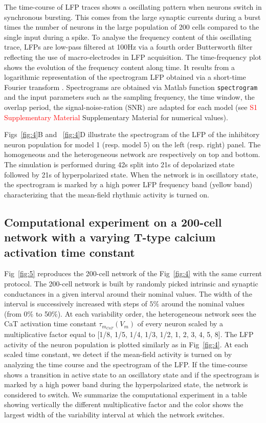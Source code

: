 The time-course of LFP traces shows a oscillating pattern when neurons switch in synchronous bursting.  This comes from the large synaptic currents during a burst times the number of neurons in the large population of 200 cells compared to the single input during a spike.  To analyse the frequency content of this oscillating trace,  LFPs are low-pass filtered at 100Hz via a fourth order Butterworth filter reflecting the use of macro-electrodes in LFP acquisition. The time-frequency plot shows the evolution of the frequency content along time. It results from a logarithmic representation of the spectrogram LFP obtained via a short-time Fourier transform \citep{drion_switchable_2018}. Spectrograms are obtained via Matlab function \texttt{spectrogram} and the input parameters such as the sampling frequency, the time window, the overlap period, the signal-noise-ration (SNR) are adapted for each model (see \textcolor{red}{S1 Supplementary Material} Supplementary Material for numerical values).

Figs~\ref{fig:4}B and ~\ref{fig:4}D illustrate the spectrogram of the LFP of the inhibitory neuron population for model 1 (resp. model 5) on the left (resp. right) panel. The homogeneous and the heterogeneous network are respectively on top and bottom. The simulation is performed during 42s split into 21s of depolarized state followed by 21s of hyperpolarized state. When the network is in oscillatory state, the spectrogram is marked by a high power LFP frequency band (yellow band) characterizing that the mean-field rhythmic activity is turned on. 


\subsection{Computational experiment  on a 200-cell network with a varying T-type calcium activation time constant }
Fig~\ref{fig:5} reproduces the 200-cell network of the Fig~\ref{fig:4} with the same current protocol. The 200-cell network is built by randomly picked intrinsic and synaptic conductances in a given interval around their nominal values. The width of the interval is successively  increased with steps of $5\%$ around the nominal values (from 0$\%$ to 50$\%$).  At each variability order, the heterogeneous network sees the CaT activation time constant $\tau_{m_{CaT}}(V_m)$ of every neuron scaled by a multiplicative factor equal to [1/8, 1/5, 1/4, 1/3, 1/2, 1,  2, 3, 4, 5, 8]. The LFP  activity of the neuron population is plotted similarly as in Fig~\ref{fig:4}. At each scaled time constant, we detect if the mean-field activity is turned on by analyzing the time course and the spectrogram of the LFP. If the time-course shows a transition in active state to an oscillatory state and if the spectrogram is marked by a high power band during the hyperpolarized state, the network is considered to switch. We summarize the computational experiment in a table showing vertically the different multiplicative factor and the color shows the largest width of the variability interval at which the network switches. 


